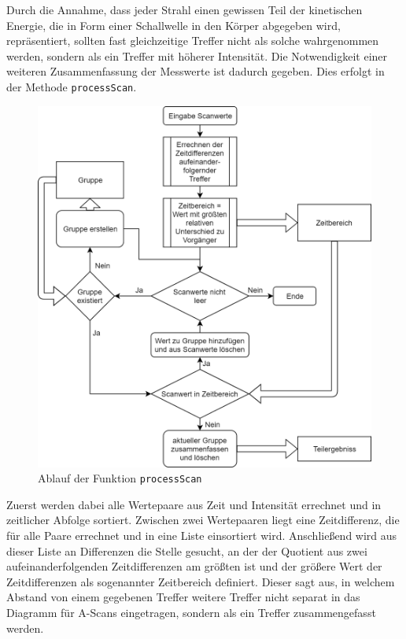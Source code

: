 \documentclass[reducespace,stylepage,semiarbeit]{spezidoc}
\begin{document}
Durch die Annahme, dass jeder Strahl einen gewissen Teil der kinetischen Energie, die in Form einer Schallwelle in den Körper abgegeben wird, repräsentiert, sollten fast gleichzeitige Treffer nicht als solche wahrgenommen werden, sondern als ein Treffer mit höherer Intensität. 
Die Notwendigkeit einer weiteren Zusammenfassung der Messwerte ist dadurch gegeben. 
Dies erfolgt in der Methode \texttt{processScan}. \par 
\begin{figure}
\includegraphics[scale=0.3]{pictures/Flowchart_processScan.png}
\caption{Ablauf der Funktion \texttt{processScan}}
\end{figure} 
Zuerst werden dabei alle Wertepaare aus Zeit und Intensität errechnet und in zeitlicher Abfolge sortiert. 
Zwischen zwei Wertepaaren liegt eine Zeitdifferenz, die für alle Paare errechnet und in eine Liste einsortiert wird.
Anschließend wird aus dieser Liste an Differenzen die Stelle gesucht, an der der Quotient aus zwei aufeinanderfolgenden Zeitdifferenzen am größten ist und der größere Wert der Zeitdifferenzen als sogenannter Zeitbereich definiert. %
Dieser sagt aus, in welchem Abstand von einem gegebenen Treffer weitere Treffer nicht separat in das Diagramm für A-Scans eingetragen, sondern als ein Treffer zusammengefasst werden.\\
\end{document}
